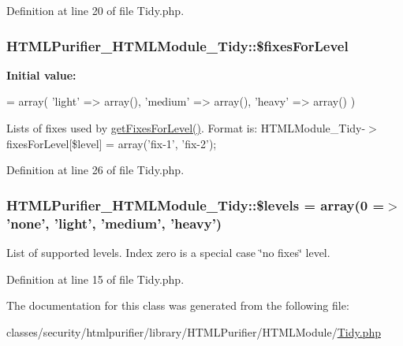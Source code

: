 Definition at line 20 of file Tidy.\+php.

\hypertarget{classHTMLPurifier__HTMLModule__Tidy_a1bfe0abd281d86ed31562468d0104aac}{
\subsubsection[{\$fixes\+For\+Level}]{\setlength{\rightskip}{0pt plus 5cm}H\+T\+M\+L\+Purifier\+\_\+\+H\+T\+M\+L\+Module\+\_\+\+Tidy\+::\$fixes\+For\+Level}}\label{classHTMLPurifier__HTMLModule__Tidy_a1bfe0abd281d86ed31562468d0104aac}
{\bfseries Initial value\+:}
\begin{DoxyCode}
= array(
        \textcolor{stringliteral}{'light'}  => array(),
        \textcolor{stringliteral}{'medium'} => array(),
        \textcolor{stringliteral}{'heavy'}  => array()
    )
\end{DoxyCode}
Lists of fixes used by \hyperlink{classHTMLPurifier__HTMLModule__Tidy_a6afdc4634fb922bf30d1ff3c12bd85e9}{get\+Fixes\+For\+Level()}. Format is\+: H\+T\+M\+L\+Module\+\_\+\+Tidy-\/$>$fixes\+For\+Level\mbox{[}\$level\mbox{]} = array('fix-\/1', 'fix-\/2'); 

Definition at line 26 of file Tidy.\+php.

\hypertarget{classHTMLPurifier__HTMLModule__Tidy_a700db969800293dd50c3b85c29722b80}{
\subsubsection[{\$levels}]{\setlength{\rightskip}{0pt plus 5cm}H\+T\+M\+L\+Purifier\+\_\+\+H\+T\+M\+L\+Module\+\_\+\+Tidy\+::\$levels = array(0 =$>$ 'none', 'light', 'medium', 'heavy')}}\label{classHTMLPurifier__HTMLModule__Tidy_a700db969800293dd50c3b85c29722b80}
List of supported levels. Index zero is a special case \char`\"{}no fixes\char`\"{} level. 

Definition at line 15 of file Tidy.\+php.



The documentation for this class was generated from the following file\+:\begin{DoxyCompactItemize}
\item 
classes/security/htmlpurifier/library/\+H\+T\+M\+L\+Purifier/\+H\+T\+M\+L\+Module/\hyperlink{Tidy_8php}{Tidy.\+php}\end{DoxyCompactItemize}
